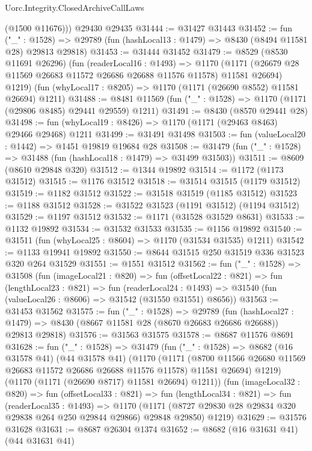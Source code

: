 \begin{lexlean}{Uorc.Integrity.ClosedArchiveCallLaws}
\begin{coremodule}
        (@1500 @11676)))
    @29430
    @29435
@31444 := @31427 @31443
@31452 := fun ("_" : @1528) =>
  @29789 (fun (hashLocal13 : @1479) => @8430 (@8494 @11581 @28) @29813 @29818)
@31453 := @31444 @31452
@31479 := @8529
    (@8530 @11691 @26296)
    (fun (readerLocal16 : @1493) =>
    @1170 (@1171 (@26679 @28 @11569 @26683 @11572 @26686 @26688 @11576 @11578) @11581 @26694) @1219)
    (fun (whyLocal17 : @8205) => @1170 (@1171 (@26690 @8552) @11581 @26694) @1211)
@31488 := @8481 @11569 (fun ("_" : @1528) => @1170 (@1171 (@29806 @8485) @29441 @29559) @1211)
@31491 := @8430 (@8570 @29441 @28)
@31498 := fun (whyLocal19 : @8426) => @1170 (@1171 (@29463 @8463) @29466 @29468) @1211
@31499 := @31491 @31498
@31503 := fun (valueLocal20 : @1442) => @1451 @19819 @19684 @28
@31508 := @31479 (fun ("_" : @1528) => @31488 (fun (hashLocal18 : @1479) => @31499 @31503))
@31511 := @8609 (@8610 @29848 @320)
@31512 := @1344 @19892
@31514 := @1172 (@1173 @31512)
@31515 := @1176 @31512
@31518 := @31514 @31515 (@1179 @31512)
@31519 := @1182 @31512
@31522 := @31518 @31519 (@1185 @31512)
@31523 := @1188 @31512
@31528 := @31522 @31523 (@1191 @31512) (@1194 @31512)
@31529 := @1197 @31512
@31532 := @1171 (@31528 @31529 @8631)
@31533 := @1132 @19892
@31534 := @31532 @31533
@31535 := @1156 @19892
@31540 := @31511 (fun (whyLocal25 : @8604) => @1170 (@31534 @31535) @1211)
@31542 := @1133 @19941 @19892
@31550 := @8644 @31515 @250 @31519 @336 @31523 @320 @264 @31529
@31551 := @1551 @31512
@31562 := fun ("_" : @1528) =>
  @31508
    (fun (imageLocal21 : @820) =>
    fun (offsetLocal22 : @821) =>
    fun (lengthLocal23 : @821) =>
    fun (readerLocal24 : @1493) =>
    @31540 (fun (valueLocal26 : @8606) => @31542 (@31550 @31551) @8656))
@31563 := @31453 @31562
@31575 := fun ("_" : @1528) =>
  @29789
    (fun (hashLocal27 : @1479) =>
    @8430 (@8667 @11581 @28 (@8670 @26683 @26686 @26688)) @29813 @29818)
@31576 := @31563 @31575
@31578 := @8687 @11576 @8691
@31628 := fun ("_" : @1528) =>
  @31479
    (fun ("_" : @1528) =>
    @8682
      (@16 @31578 @41)
      (@44 @31578 @41)
      (@1170
        (@1171 (@8700 @11566 @26680 @11569 @26683 @11572 @26686 @26688 @11576 @11578) @11581 @26694)
        @1219)
      (@1170 (@1171 (@26690 @8717) @11581 @26694) @1211))
    (fun (imageLocal32 : @820) =>
    fun (offsetLocal33 : @821) =>
    fun (lengthLocal34 : @821) =>
    fun (readerLocal35 : @1493) =>
    @1170 (@1171 (@8727 @29830 @28 @29834 @320 @29838 @264 @250 @29844 @29866) @29848 @29850) @1219)
@31629 := @31576 @31628
@31631 := @8687 @26304 @1374
@31652 := @8682
    (@16 @31631 @41)
    (@44 @31631 @41)

\end{coremodule}
\end{lexlean}
